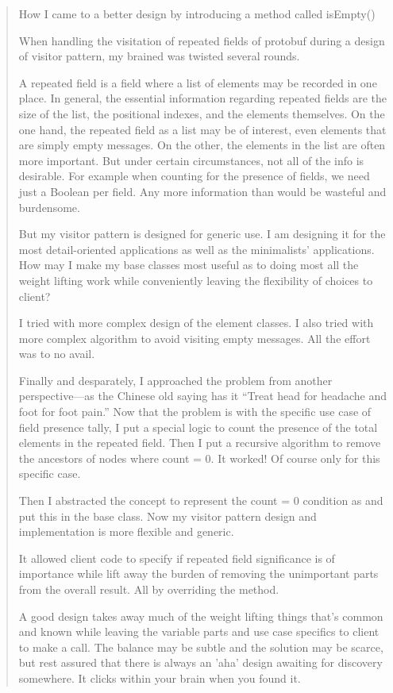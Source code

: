 \begin{quotation}
    How I came to a better design by introducing a method called isEmpty()

    When handling the visitation of repeated fields of protobuf during a design of visitor pattern,
    my brained was twisted several rounds.

    A repeated field is a field where a list of elements may be recorded in one place.
    In general, the essential information regarding repeated fields are the size of the list, the
    positional indexes, and the elements themselves.
    On the one hand, the repeated field as a list may be of interest, even elements that
    are simply empty messages.
    On the other, the elements in the list are often more important.
    But under certain circumstances, not all of the info is desirable.
    For example when counting for the presence of fields, we need just a Boolean per field.
    Any more information than would be wasteful and burdensome.

    But my visitor pattern is designed for generic use.
    I am designing it for the most detail-oriented applications as well as the minimalists'
    applications.
    How may I make my base classes most useful as to doing most all the weight lifting work while
    conveniently leaving the flexibility of choices to client?

    I tried with more complex design of the element classes.
    I also tried with more complex algorithm to
    avoid visiting empty messages.
    All the effort was to no avail.

    Finally and desparately, I approached the problem from another perspective---as the Chinese
    old saying has it ``Treat head for headache and foot for foot pain.''
    Now that the problem is with the specific use case of field presence tally,
    I put a special logic to count the
    presence of the total elements in the repeated field.
    Then I put a recursive algorithm to remove
    the ancestors of nodes where count = 0.
    It worked!
    Of course only for this specific case.

    Then I abstracted the concept to represent the count = 0 condition as  and put
    this in the base class.
    Now my visitor pattern design and implementation is more flexible and generic.

    It allowed client code to specify if repeated field significance is of importance while lift
    away the burden of removing the unimportant parts from the overall result.
    All by overriding the  method.

    A good design takes away much of the weight lifting things that's common and known while leaving
    the variable parts and use case specifics to client to make a call.
    The balance may be subtle and
    the solution may be scarce, but rest assured that there is always an 'aha' design awaiting
    for discovery somewhere.
    It clicks within your brain when you found it.
\end{quotation}

